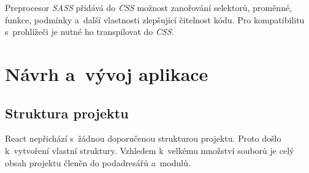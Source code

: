 \documentclass[a4paper,12pt]{article}
\begin{document}
Preprocesor \textit{SASS} přidává do \textit{CSS} možnost zanořování selektorů, proměnné, funkce, podmínky a~další vlastnosti zlepšující čitelnost kódu. Pro kompatibilitu s~prohlížeči je nutné ho transpilovat do \textit{CSS}.

\section{Návrh a~vývoj aplikace}

\subsection{Struktura projektu}

React nepřichází s~žádnou doporučenou strukturou projektu. Proto došlo k~vytvoření vlastní struktury. Vzhledem k~velkému množství souborů je celý obsah projektu členěn do podadresářů a~modulů.
\end{document}
